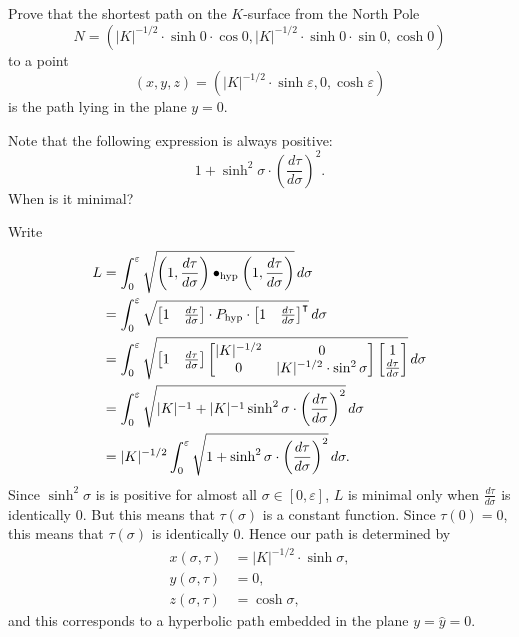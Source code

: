 \documentclass{ximera}
\begin{document}
\begin{problem}
  Prove that the shortest path on the $K$-surface from the North Pole
  \[
  N=\left( |K|^{-1/2}\cdot \sinh 0\cdot  \cos 0,|K|^{-1/2}\cdot \sinh  0\cdot \sin 0,\cosh
  0\right)
  \]
  to a point
  \[
  (x,y,z)=\left(|K|^{-1/2}\cdot \sinh \varepsilon,0,\cosh \varepsilon\right)
  \]
  is the path lying in the plane $y=0$.
  \begin{hint}
    Note that the following expression is always positive:
    \[
    1+\sinh^{2}\sigma\cdot \left(\frac{d\tau }{d\sigma}\right)^{2}.
    \]
    When is it minimal?
  \end{hint}

  \begin{freeResponse}
    Write
    \begin{align*}
    L  &=\int_{0}^{\varepsilon} \sqrt{\left(1,\dd[\tau]{\sigma}\right)\bullet_\mathrm{hyp} \left(1,\dd[\tau]{\sigma}\right)}\d\sigma\\
    &= \int_{0}^{\varepsilon} \sqrt{
      \begin{bmatrix} 1 & \dd[\tau]{\sigma}
      \end{bmatrix} \cdot P_\mathrm{hyp}\cdot
      \begin{bmatrix} 1 & \dd[\tau]{\sigma}
      \end{bmatrix}^\transpose}\d\sigma \\
    &= \int_{0}^{\varepsilon} \sqrt{
      \begin{bmatrix} 1 & \dd[\tau]{\sigma}
      \end{bmatrix}
      \begin{bmatrix}
        |K|^{-1/2} & 0 \\
        0 & |K|^{-1/2}\cdot\sin^2 \sigma
      \end{bmatrix}
      \begin{bmatrix} 1 \\ \dd[\tau]{\sigma}
    \end{bmatrix}}\d\sigma \\
    &= \int_{0}^{\varepsilon} \sqrt{
      |K|^{-1}+|K|^{-1}\sinh^{2}\sigma\cdot \left(\frac{d\tau }{d\sigma}\right)^{2}
    }\d\sigma \\
    &= |K|^{-1/2}\int_{0}^{\varepsilon} \sqrt{
      1+\sinh^{2}\sigma\cdot \left(\frac{d\tau }{d\sigma}\right)^{2}
    }\d\sigma.
    \end{align*}
   Since $\sinh^{2}\sigma$ is is positive for almost all $\sigma\in[
     0,\varepsilon] $, $L$ is minimal only when
   $\frac{d\tau}{d\sigma}$ is identically $0$. But this means that
   $\tau\left( \sigma\right) $ is a constant function. Since
   $\tau\left( 0\right) =0$, this means that $\tau\left( \sigma\right)
   $ is identically $0$. Hence our path is determined by
   \begin{align*}
     x(\sigma,\tau) &=|K|^{-1/2}\cdot \sinh\sigma,\\
     y(\sigma,\tau) &=0,\\
     z(\sigma,\tau) &=\cosh \sigma,
   \end{align*}
   and this corresponds to a hyperbolic path embedded in the plane
   $y=\hat{y}=0$.
  \end{freeResponse}

\end{problem}
\end{document}

